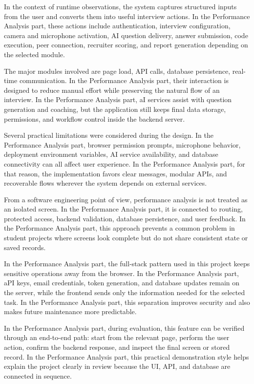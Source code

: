 \documentclass[12pt,a4paper]{report}
\begin{document}
In the context of runtime observations, the system captures structured inputs from the user and converts them into useful interview actions. In the Performance Analysis part, these actions include authentication, interview configuration, camera and microphone activation, AI question delivery, answer submission, code execution, peer connection, recruiter scoring, and report generation depending on the selected module.


The major modules involved are page load, API calls, database persistence, real-time communication. In the Performance Analysis part, their interaction is designed to reduce manual effort while preserving the natural flow of an interview. In the Performance Analysis part, aI services assist with question generation and coaching, but the application still keeps final data storage, permissions, and workflow control inside the backend server.


Several practical limitations were considered during the design. In the Performance Analysis part, browser permission prompts, microphone behavior, deployment environment variables, AI service availability, and database connectivity can all affect user experience. In the Performance Analysis part, for that reason, the implementation favors clear messages, modular APIs, and recoverable flows wherever the system depends on external services.


From a software engineering point of view, performance analysis is not treated as an isolated screen. In the Performance Analysis part, it is connected to routing, protected access, backend validation, database persistence, and user feedback. In the Performance Analysis part, this approach prevents a common problem in student projects where screens look complete but do not share consistent state or saved records.


In the Performance Analysis part, the full-stack pattern used in this project keeps sensitive operations away from the browser. In the Performance Analysis part, aPI keys, email credentials, token generation, and database updates remain on the server, while the frontend sends only the information needed for the selected task. In the Performance Analysis part, this separation improves security and also makes future maintenance more predictable.


In the Performance Analysis part, during evaluation, this feature can be verified through an end-to-end path: start from the relevant page, perform the user action, confirm the backend response, and inspect the final screen or stored record. In the Performance Analysis part, this practical demonstration style helps explain the project clearly in review because the UI, API, and database are connected in sequence.
\end{document}
